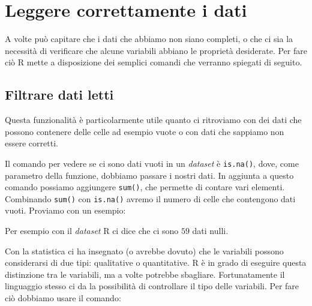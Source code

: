 \chapter{Leggere correttamente i dati}

A volte può capitare che i dati che abbiamo non siano completi, o che ci sia la
necessità di verificare che alcune variabili abbiano le proprietà desiderate.
Per fare ciò R mette a disposizione dei semplici comandi che verranno spiegati
di seguito.

\section{Filtrare dati letti}

Questa funzionalità è particolarmente utile quanto ci ritroviamo con dei dati
che possono contenere delle celle ad esempio vuote o con dati che sappiamo non
essere corretti.

Il comando per vedere se ci sono dati vuoti in un \textit{dataset} è
\texttt{is.na()}, dove, come parametro della funzione, dobbiamo passare i
nostri dati. In aggiunta a questo comando possiamo aggiungere \texttt{sum()},
che permette di contare vari elementi. Combinando \texttt{sum()} con
\texttt{is.na()} avremo il numero di celle che contengono dati vuoti.
Proviamo con un esempio:



Per esempio con il \textit{dataset} R ci dice che ci sono $59$ dati nulli.

Con la statistica ci ha insegnato (o avrebbe dovuto) che le variabili possono
considerarsi di due tipi: qualitative o quantitative. R è in grado di eseguire
questa distinzione tra le variabili, ma a volte potrebbe sbagliare.
Fortunatamente il linguaggio stesso ci da la possibilità di controllare il tipo
delle variabili. Per fare ciò dobbiamo usare il comando:

